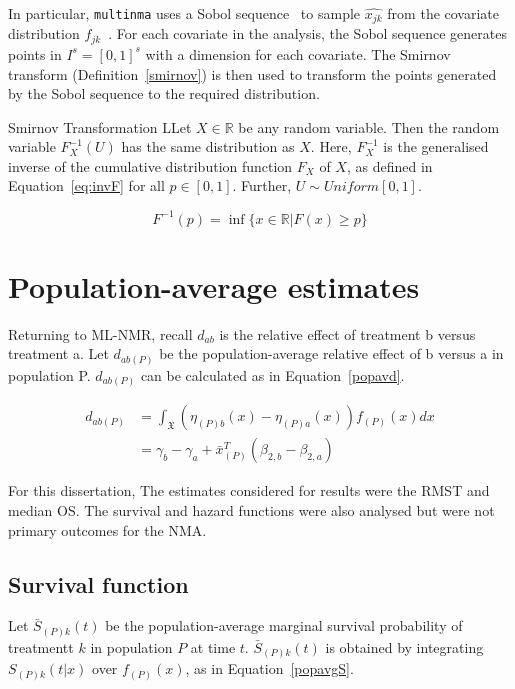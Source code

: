 In particular, \verb|multinma| uses a Sobol sequence~\cite{sobol} to sample $\hat{x_{jk}}$ from the covariate distribution $f_{jk}$~\cite{phillippo2020}. For each covariate in the analysis, the Sobol sequence generates points in $I^s = [0,1]^s$ with a dimension for each covariate. The Smirnov transform (Definition~\ref{smirnov}) is then used to transform the points generated by the Sobol sequence to the required distribution. 

\begin{definition}{Smirnov Transformation}
    LLet $X \in \mathbb{R}$ be any random variable. Then the random variable $F_X^{-1}(U)$ has the same distribution as $X$. Here, $F_X^{-1}$ is the generalised inverse of the cumulative distribution function $F_X$ of $X$, as defined in Equation~\ref{eq:invF} for all $p \in [0,1]$. Further, $U \sim Uniform[0,1]$.

    \begin{equation}
        F^{-1}(p) = \inf \{x \in \mathbb{R} | F(x) \geq p \}
        \label{eq:invF}
    \end{equation}
    \label{smirnov}
\end{definition}

\section{Population-average estimates}
Returning to ML-NMR, recall $d_{ab}$ is the relative effect of treatment b versus treatment a. Let $d_{ab(P)}$ be the population-average relative effect of b versus a in population P. $d_{ab(P)}$ can be calculated as in Equation~\ref{popavd}. 

\begin{align}
    d_{ab(P)} &= \int_{\mathfrak{X}}(\eta_{(P)b}(x) - \eta_{(P)a}(x))f_{(P)}(x)dx \label{popavgdInt} \\
              &= \gamma_b - \gamma_a + \bar{x}^T_{(P)}(\beta_{2,b}-\beta_{2,a}) \label{popavd}
\end{align}

For this dissertation, The estimates considered for results were the RMST and median OS. The survival and hazard functions were also analysed but were not primary outcomes for the NMA.

\subsection{Survival function}
Let $\bar{S}_{(P)k}(t)$ be the population-average marginal survival probability of treatmentt $k$ in population $P$ at time $t$. $\bar{S}_{(P)k}(t)$ is obtained by integrating $S_{(P)k}(t|x)$ over $f_{(P)}(x)$, as in Equation~\ref{popavgS}.

